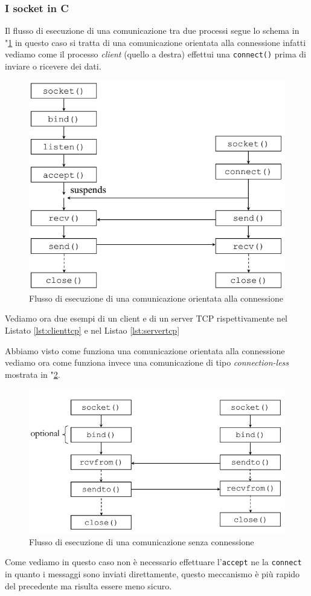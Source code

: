 \subsubsection{I socket in C}
Il flusso di esecuzione di una comunicazione tra due processi segue lo schema in \figurename"\ref{fig:streamsocket} in questo caso si tratta di una comunicazione orientata alla connessione infatti vediamo come il processo \emph{client} (quello a destra) effettui una \texttt{connect()} prima di inviare o ricevere dei dati.
\begin{figure}
\centering
\includegraphics[width=0.7\linewidth]{img/streamsocket}
\caption{Flusso di esecuzione di una comunicazione orientata alla connessione}
\label{fig:streamsocket}
\end{figure}
Vediamo ora due esempi di un client e di un server TCP rispettivamente nel Listato \ref{lst:clienttcp} e nel Listao \ref{lst:servertcp}


Abbiamo visto come funziona una comunicazione orientata alla connessione vediamo ora come funziona invece una comunicazione di tipo \emph{connection-less} mostrata in \figurename"\ref{fig:udpcon}.
\begin{figure}
\centering
\includegraphics[width=0.7\linewidth]{img/udpcon}
\caption{Flusso di esecuzione di una comunicazione senza connessione}
\label{fig:udpcon}
\end{figure}
Come vediamo in questo caso non è necessario effettuare l'\texttt{accept} ne la \texttt{connect} in quanto i messaggi sono inviati direttamente, questo meccanismo è più rapido del precedente ma risulta essere meno sicuro.

